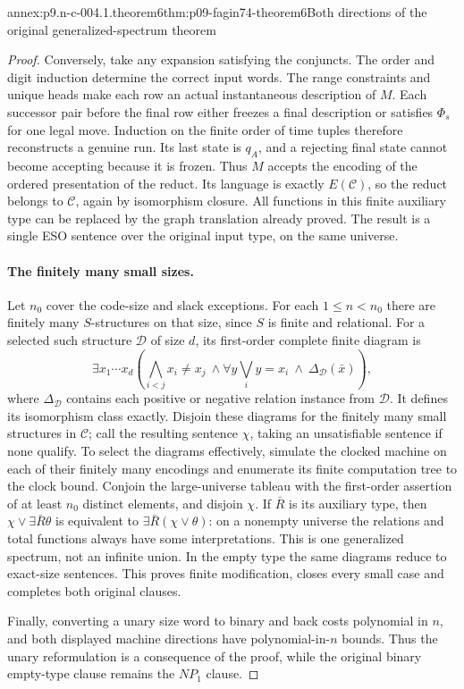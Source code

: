 \begin{annexitem}{annex:p9.n-c-004.1.theorem6}{thm:p09-fagin74-theorem6}{Both directions of the original generalized-spectrum theorem}
\begin{proof}
Conversely, take any expansion satisfying the conjuncts.  The order and digit
induction determine the correct input words.  The range constraints and unique
heads make each row an actual instantaneous description of \(M\).  Each
successor pair before the final row either freezes a final description or
satisfies \(\Phi_s\) for one legal move.  Induction on the finite order of
time tuples therefore reconstructs a genuine run.  Its last state is
\(q_A\), and a rejecting final state cannot become accepting because it is
frozen.  Thus \(M\) accepts the encoding of the ordered presentation of
the reduct.  Its language is exactly \(E(\mathcal C)\), so the reduct
belongs to \(\mathcal C\), again by isomorphism closure.
All functions in this finite auxiliary type can be replaced by the graph
translation already proved.  The result is a single ESO sentence over the
original input type, on the same universe.

\paragraph{The finitely many small sizes.}
Let \(n_0\) cover the code-size and slack exceptions.  For each
\(1\leq n<n_0\) there are finitely many \(S\)-structures on that size,
since \(S\) is finite and relational.  For a selected such structure
\(\mathcal D\) of size \(d\), its first-order complete finite diagram is
\[
 \exists x_1\cdots x_d\left(
   \bigwedge_{i<j}x_i\ne x_j\ \land
   \forall y\bigvee_i y=x_i\ \land\ \Delta_{\mathcal D}(\bar x)
 \right),
\]
where \(\Delta_{\mathcal D}\) contains each positive or negative relation
instance from \(\mathcal D\).  It defines its isomorphism class exactly.
Disjoin these diagrams for the finitely many small structures in
\(\mathcal C\); call the resulting sentence \(\chi\), taking an
unsatisfiable sentence if none qualify.  To select the diagrams effectively,
simulate the clocked machine on each of their finitely many encodings and
enumerate its finite computation tree to the clock bound.
Conjoin the large-universe tableau
with the first-order assertion of at least \(n_0\) distinct elements, and
disjoin \(\chi\).  If \(\bar R\) is its auxiliary type, then
\(\chi\lor\exists\bar R\theta\) is equivalent to
\(\exists\bar R(\chi\lor\theta)\): on a nonempty universe the relations
and total functions always have some interpretations.  This is one
generalized spectrum, not an infinite union.  In the empty type the same
diagrams reduce to exact-size sentences.  This proves finite modification,
closes every small case and completes both original clauses.

Finally, converting a unary size word to binary and back costs polynomial in
\(n\), and both displayed machine directions have polynomial-in-\(n\)
bounds.  Thus the unary reformulation is a consequence of the proof, while
the original binary empty-type clause remains the \(NP_1\) clause.
\end{proof}
\end{annexitem}

